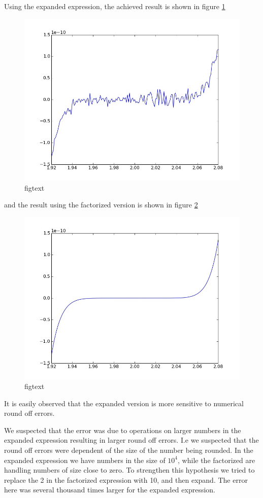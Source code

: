 \message{ !name(assignment4.tex)}\documentclass[a4paper]{article}
\begin{document}
\begin{enumerate}
Using the expanded expression, the achieved result is shown in figure \ref{fig: t21}
\begin{figure}
\centering
\includegraphics[scale=0.3]{task2_2.jpeg}
\caption{\label{fig: t21}figtext}
\end{figure} 
and the result using the factorized version is shown in figure \ref{fig: t22}
\begin{figure}
\centering
\includegraphics[scale=0.3]{task2_b_1.jpeg}
\caption{\label{fig: t22}figtext}
\end{figure} 
It is easily observed that the expanded version is more sensitive to numerical round off errors.

We suspected that the error was due to operations on larger numbers in the expanded expression resulting in larger round off errors. I.e we suspected that the round off errors were dependent of the size of the number being rounded. In the expanded expression we have numbers in the size of $10^4$, while the factorized are handling numbers of size close to zero. To strengthen this hypothesis we tried to replace the 2 in the factorized expression with 10, and then expand. The error here was several thousand times larger for the expanded expression.


\end{enumerate}
\end{document}
